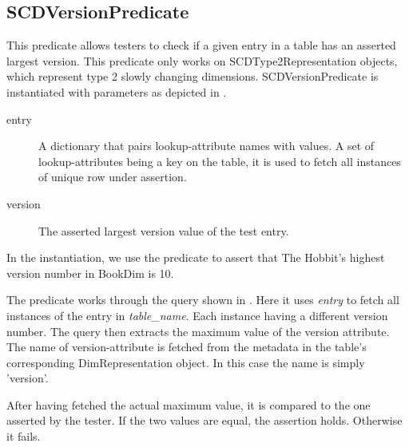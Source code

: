\subsection{SCDVersionPredicate}\label{SCD}
This predicate allows testers to check if a given entry in a table has an asserted largest version. This predicate only works on SCDType2Representation objects, which represent type 2 slowly changing dimensions. SCDVersionPredicate is instantiated with parameters as depicted in .


\begin{description}
\item [entry] A dictionary that pairs lookup-attribute names with values. A set of lookup-attributes being a key on the table, it is used to fetch all instances of unique row under assertion.
\item [version] The asserted largest version value of the test entry.
\end{description}

In the instantiation, we use the predicate to assert that The Hobbit's highest version number in BookDim is 10.

The predicate works through the query shown in . Here it uses \textit{entry} to fetch all instances of the entry in \textit{table\_name}. Each instance having a different version number. The query then extracts the maximum value of the version attribute. The name of version-attribute is fetched from the metadata in the table's corresponding DimRepresentation object. In this case the name is simply 'version'.


After having fetched the actual maximum value, it is compared to the one asserted by the tester. If the two values are equal, the assertion holds. Otherwise it fails.